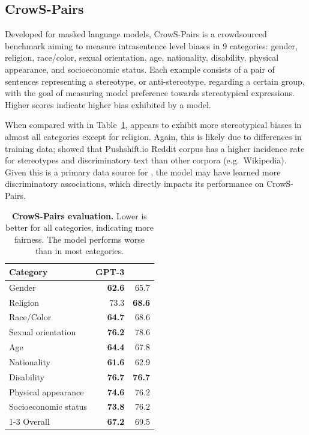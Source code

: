 \subsection{CrowS-Pairs}
Developed for masked language models, CrowS-Pairs \cite{nangia2020crows} is a crowdsourced benchmark aiming to measure intrasentence level biases in 9 categories: gender, religion, race/color, sexual orientation, age, nationality, disability, physical appearance, and socioeconomic status. Each example consists of a pair of sentences representing a stereotype, or anti-stereotype, regarding a certain group, with the goal of measuring model preference towards stereotypical expressions.  Higher scores indicate higher bias exhibited by a model.

When compared with \davinci{} in Table~\ref{tab:crowspairs}, \OPT{} appears to exhibit more stereotypical biases in almost all categories except for religion.  Again, this is likely due to differences in training data;  \citet{nangia2020crows} showed that Pushshift.io Reddit corpus has a higher incidence rate for stereotypes and discriminatory text than other corpora (e.g.~Wikipedia). Given this is a primary data source for \OPT{}, the model may have learned more discriminatory associations, which directly impacts its performance on CrowS-Pairs. 

\begin{table}[t]
    \centering
    \begin{tabular}{lrr}
\toprule
Category &  {\bf GPT-3} & {\bf \OPT{}}\\
\midrule
Gender    & {\bf 62.6} & 65.7\\
Religion & 73.3	& {\bf 68.6}\\
Race/Color & {\bf 64.7} & 68.6\\
Sexual orientation & {\bf 76.2} & 78.6\\
Age & {\bf 64.4} & 67.8\\
Nationality & {\bf 61.6} & 62.9\\
Disability & {\bf 76.7} & {\bf 76.7}\\
Physical appearance & {\bf 74.6} & {76.2}\\
Socioeconomic status & {\bf 73.8} & 76.2\\
\cmidrule(lr){1-3}
Overall & {\bf 67.2} & 69.5\\
\bottomrule
    \end{tabular}
    \caption{{\bf CrowS-Pairs evaluation.} Lower is better for all categories, indicating more fairness. The \OPT{} model
    performs worse than \davinci{} in most categories.}
    \label{tab:crowspairs}
\end{table}


